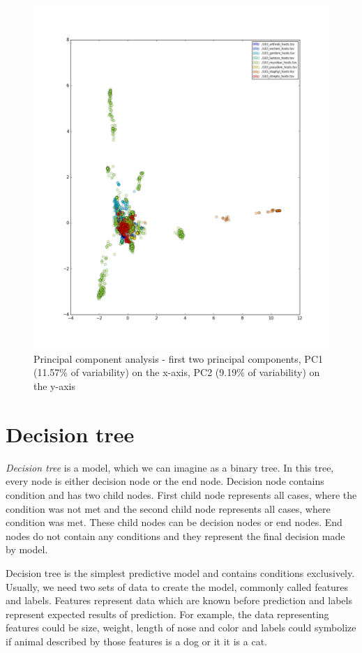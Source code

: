 \begin{figure}[htp]
\includegraphics[width=\linewidth]{./images/pca.png}
\centering
\caption[Principal component analysis]{Principal component analysis - first two principal components, PC1 (11.57\% of variability) on the x-axis, PC2 (9.19\% of variability) on the y-axis}
\label{pca}
\end{figure}

\section{Decision tree}
\emph{Decision tree} is a model, which we can imagine as a binary tree.
In this tree, every node is either decision node or the end node.
Decision node contains condition and has two child nodes.
First child node represents all cases, where the condition was not met and the second child node represents all cases, where condition was met.
These child nodes can be decision nodes or end nodes.
End nodes do not contain any conditions and they represent the final decision made by model.

Decision tree is the simplest predictive model and contains conditions exclusively.
Usually, we need two sets of data to create the model, commonly called features and labels.
Features represent data which are known before prediction and labels represent expected results of prediction.
For example, the data representing features could be size, weight, length of nose and color and labels could symbolize if animal described by those features is a dog or it it is a cat.

